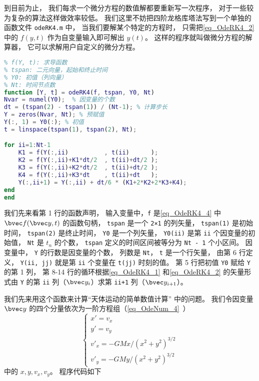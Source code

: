 到目前为止， 我们每求一个微分方程的数值解都要重新写一次程序， 对于一些较为复杂的算法这样做效率较低。 我们这里不妨把四阶龙格库塔法写到一个单独的函数文件 \verb|odeRK4.m| 中， 当我们要解某个特定的方程时， 只需把\autoref{eq_OdeRK4_2} 中的 $f(y, t)$ 作为自变量输入即可解出 $y(t)$。 这样的程序就叫做微分方程的解算器， 它可以求解用户自定义的微分方程。

\begin{lstlisting}[language=matlab, caption=odeRK4.m]
% 四阶龙格库塔定步长节微分方程
% f(Y, t): 求导函数
% tspan: 二元向量，起始和终止时间
% Y0: 初值（列向量）
% Nt: 时间节点数
function [Y, t] = odeRK4(f, tspan, Y0, Nt)
Nvar = numel(Y0);  % 因变量的个数
dt = (tspan(2) - tspan(1)) / (Nt-1); % 计算步长
Y = zeros(Nvar, Nt); % 预赋值
Y(:, 1) = Y0(:); % 初值
t = linspace(tspan(1), tspan(2), Nt);

for ii=1:Nt-1
    K1 = f(Y(:,ii)          , t(ii)      );
    K2 = f(Y(:,ii)+K1*dt/2  , t(ii)+dt/2 );
    K3 = f(Y(:,ii)+K2*dt/2  , t(ii)+dt/2 );
    K4 = f(Y(:,ii)+K3*dt    , t(ii)+dt   );
    Y(:,ii+1) = Y(:,ii) + dt/6 * (K1+2*K2+2*K3+K4);
end
end
\end{lstlisting}

我们先来看第 1 行的函数声明， 输入变量中，\verb|f| 是\autoref{eq_OdeRK4_4} 中 $\bvec f(\bvec y, t)$ 的函数句柄， \verb|tspan| 是一个 \verb|2×1| 的列矢量， \verb|tspan(1)| 是初始时间， \verb|tspan(2)| 是终止时间， \verb|Y0| 是一个列矢量， \verb|Y0(ii)| 是第 \verb|ii| 个因变量的初始值， \verb|Nt| 是 $t_n$ 的个数， \verb|tspan| 定义的时间区间被等分为 \verb|Nt - 1| 个小区间。 因变量中， \verb|Y| 的行数是因变量的个数， 列数是 \verb|Nt|， \verb|t| 是一个行矢量， 由第 6 行定义， \verb|Y(ii, jj)| 就是第 \verb|ii| 个变量在 \verb|t(jj)| 时刻的值。 第 5 行把初值 \verb|Y0| 赋给 \verb|Y| 的第 1 列， 第 8-14 行的循环根据\autoref{eq_OdeRK4_1} 和\autoref{eq_OdeRK4_2} 的矢量形式由 \verb|Y| 的第 \verb|ii| 列（$\bvec y_i$）求第 \verb|ii+1| 列（$\bvec y_{i+1}$）。

我们先来用这个函数来计算“天体运动的简单数值计算” 中的问题。 我们令因变量 $\bvec y$ 的四个分量依次为一阶方程组（\autoref{eq_OdeNum_4}~）
\begin{equation}\label{eq_OdeRK4_5}
\begin{cases}
x' = v_x\\
y' = v_y\\
v'_x = -GMx/(x^2 + y^2)^{3/2}\\
v'_y = -GMy/(x^2 + y^2)^{3/2}
\end{cases}
\end{equation}
中的 $x, y, v_x, v_y$。 程序代码如下

